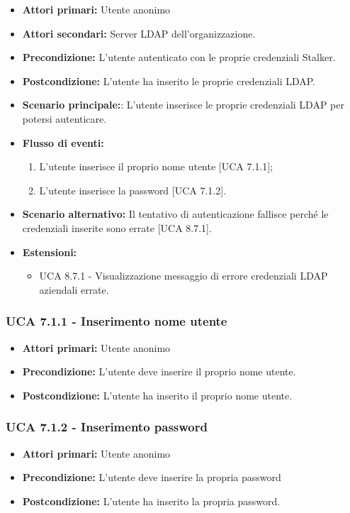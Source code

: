 \begin{itemize}
	\item \textbf{Attori primari:} Utente anonimo 
	\item \textbf{Attori secondari:} Server LDAP dell'organizzazione.
	\item \textbf{Precondizione:} L'utente  autenticato con le proprie credenziali Stalker.
	\item \textbf{Postcondizione:} L'utente ha inserito le proprie credenziali LDAP.
	\item \textbf{Scenario principale:}: L'utente inserisce le proprie credenziali LDAP per potersi autenticare.
	\item \textbf{Flusso di eventi:}
	\begin{enumerate}
		\item L'utente inserisce il proprio nome utente [UCA 7.1.1];
		\item L'utente inserisce la password [UCA 7.1.2].
	\end{enumerate}
	\item \textbf{Scenario alternativo:} Il tentativo di autenticazione fallisce perché le credenziali inserite sono errate [UCA 8.7.1].
	\item \textbf{Estensioni:}
	\begin{itemize}
		\item UCA 8.7.1 - Visualizzazione messaggio di errore credenziali LDAP aziendali errate.
	\end{itemize}
\end{itemize}

\subsubsection{UCA 7.1.1 - Inserimento nome utente}%
\begin{itemize}
	\item \textbf{Attori primari:} Utente anonimo
	\item \textbf{Precondizione:} L'utente deve inserire il proprio nome utente.
	\item \textbf{Postcondizione:} L'utente ha inserito il proprio nome utente.
\end{itemize}

\subsubsection{UCA 7.1.2 - Inserimento password}%
\begin{itemize}
	\item \textbf{Attori primari:} Utente anonimo
	\item \textbf{Precondizione:} L'utente deve inserire la propria password
	\item \textbf{Postcondizione:} L'utente ha inserito la propria password.
\end{itemize}
